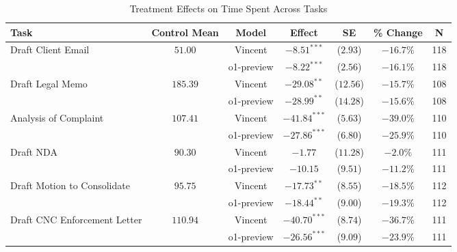 \begin{table}[!htbp]
\centering
\caption{Treatment Effects on Time Spent Across Tasks}
\label{tab:time_spent_effects_controls}
\vspace{0.3cm}
\begin{tabular}{lcccccc}
\hline\hline
Task & Control Mean & Model & Effect & SE & \% Change & N \\
\hline
\multirow{2}{*}{Draft Client Email} & \multirow{2}{*}{$51.00$} & Vincent & $-8.51^{***}$ & ($2.93$) & $-16.7\%$ & 118 \\
& & o1-preview & $-8.22^{***}$ & ($2.56$) & $-16.1\%$ & 118 \\
\hline
\multirow{2}{*}{Draft Legal Memo} & \multirow{2}{*}{$185.39$} & Vincent & $-29.08^{**}$ & ($12.56$) & $-15.7\%$ & 108 \\
& & o1-preview & $-28.99^{**}$ & ($14.28$) & $-15.6\%$ & 108 \\
\hline
\multirow{2}{*}{Analysis of Complaint} & \multirow{2}{*}{$107.41$} & Vincent & $-41.84^{***}$ & ($5.63$) & $-39.0\%$ & 110 \\
& & o1-preview & $-27.86^{***}$ & ($6.80$) & $-25.9\%$ & 110 \\
\hline
\multirow{2}{*}{Draft NDA} & \multirow{2}{*}{$90.30$} & Vincent & $-1.77$ & ($11.28$) & $-2.0\%$ & 111 \\
& & o1-preview & $-10.15$ & ($9.51$) & $-11.2\%$ & 111 \\
\hline
\multirow{2}{*}{Draft Motion to Consolidate} & \multirow{2}{*}{$95.75$} & Vincent & $-17.73^{**}$ & ($8.55$) & $-18.5\%$ & 112 \\
& & o1-preview & $-18.44^{**}$ & ($9.00$) & $-19.3\%$ & 112 \\
\hline
\multirow{2}{*}{Draft CNC Enforcement Letter} & \multirow{2}{*}{$110.94$} & Vincent & $-40.70^{***}$ & ($8.74$) & $-36.7\%$ & 111 \\
& & o1-preview & $-26.56^{***}$ & ($9.09$) & $-23.9\%$ & 111 \\
\hline
\hline\hline
\end{tabular}

\vspace{0.5cm}


\end{table}

